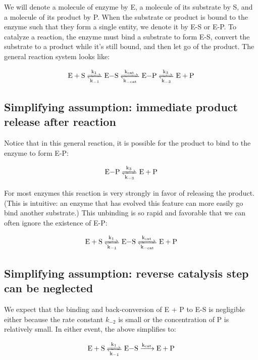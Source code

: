 \documentclass{article}
\begin{document}
We will denote a molecule of enzyme by E, a molecule of its substrate by S, and a molecule of its product by P. When the substrate or product is bound to the enzyme such that they form a single entity, we denote it by E-S or E-P. To catalyze a reaction, the enzyme must bind a substrate to form E-S, convert the substrate to a product while it's still bound, and then let go of the product. The general reaction system looks like:

\begin{eqnarray*}
\ce{E + S <=>[k_1][k_{-1}] E-S <=>[k_{\textrm{cat}}][k_{-\textrm{cat}}] E-P  <=>[k_3][k_{-3}] E + P}
\end{eqnarray*}

\subsection*{Simplifying assumption: immediate product release after reaction}

Notice that in this general reaction, it is possible for the product to bind to the enzyme to form E-P:

\begin{eqnarray*}
\ce{E-P  <=>[k_3][k_{-3}] E + P}
\end{eqnarray*}

For most enzymes this reaction is very strongly in favor of releasing the product. (This is intuitive: an enzyme that has evolved this feature can more easily go bind another substrate.) This unbinding is so rapid and favorable that we can often ignore the existence of E-P:

\begin{eqnarray*}
\ce{E + S <=>[k_1][k_{-1}] E-S <=>[k_{\textrm{cat}}][k_{-\textrm{cat}}] E + P}
\end{eqnarray*}

\subsection*{Simplifying assumption: reverse catalysis step can be neglected}

We expect that the binding and back-conversion of E + P to E-S is negligible either because the rate constant $k_{-2}$ is small or the concentration of P is relatively small. In either event, the above simplifies to:

\begin{eqnarray*}
\ce{E + S <=>[k_1][k_{-1}] E-S ->[k_{\textrm{cat}}] E + P}
\end{eqnarray*}
\end{document}
